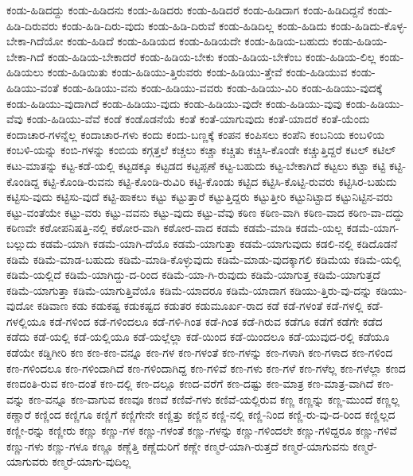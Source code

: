 {ಕಂಡು-ಹಿಡಿದದ್ದು
ಕಂಡು-ಹಿಡಿದನು
ಕಂಡು-ಹಿಡಿದರು
ಕಂಡು-ಹಿಡಿದರೆ
ಕಂಡು-ಹಿಡಿದಾಗ
ಕಂಡು-ಹಿಡಿದಿದ್ದನೆ
ಕಂಡು-ಹಿಡಿ-ದಿರುವರು
ಕಂಡು-ಹಿಡಿ-ದಿರು-ವುದು
ಕಂಡು-ಹಿಡಿ-ದಿರುವೆ
ಕಂಡು-ಹಿಡಿದಿಲ್ಲ
ಕಂಡು-ಹಿಡಿದು
ಕಂಡು-ಹಿಡಿದು-ಕೊಳ್ಳ-ಬೇಕಾ-ಗಿದೆಯೋ
ಕಂಡು-ಹಿಡಿದೆ
ಕಂಡು-ಹಿಡಿಯದ
ಕಂಡು-ಹಿಡಿಯದೇ
ಕಂಡು-ಹಿಡಿಯ-ಬಹುದು
ಕಂಡು-ಹಿಡಿಯ-ಬೇಕಾ-ಗಿದೆ
ಕಂಡು-ಹಿಡಿಯ-ಬೇಕಾದರೆ
ಕಂಡು-ಹಿಡಿಯ-ಬೇಕು
ಕಂಡು-ಹಿಡಿಯ-ಬೇಕೆಂಬ
ಕಂಡು-ಹಿಡಿಯ-ಲಿಲ್ಲ
ಕಂಡು-ಹಿಡಿಯಲು
ಕಂಡು-ಹಿಡಿಯಿತು
ಕಂಡು-ಹಿಡಿಯು-ತ್ತಿರುವರು
ಕಂಡು-ಹಿಡಿಯು-ತ್ತೇವೆ
ಕಂಡು-ಹಿಡಿಯುವ
ಕಂಡು-ಹಿಡಿಯು-ವಂತೆ
ಕಂಡು-ಹಿಡಿಯು-ವನು
ಕಂಡು-ಹಿಡಿಯು-ವವರು
ಕಂಡು-ಹಿಡಿಯು-ವಿರಿ
ಕಂಡು-ಹಿಡಿಯು-ವುದಕ್ಕೆ
ಕಂಡು-ಹಿಡಿಯು-ವುದಾಗಿದೆ
ಕಂಡು-ಹಿಡಿಯು-ವುದು
ಕಂಡು-ಹಿಡಿಯು-ವುದೇ
ಕಂಡು-ಹಿಡಿಯು-ವುವು
ಕಂಡು-ಹಿಡಿಯು-ವೆವು
ಕಂಡು-ಹಿಡಿಯು-ವೆವೆ
ಕಂಡೆ
ಕಂಡೊಡನೆಯೆ
ಕಂತೆ
ಕಂತೆ-ಯಾಗುವುದು
ಕಂತೆ-ಯಾದರೆ
ಕಂತೆ-ಯೆಂದು
ಕಂದಾಚಾರ-ಗಳನ್ನೆಲ್ಲ
ಕಂದಾಚಾರ-ಗಳು
ಕಂದು
ಕಂದು-ಬಣ್ಣಕ್ಕೆ
ಕಂಪನ
ಕಂಪಿಸಲು
ಕಂಪೆನಿ
ಕಂಬನಿಯ
ಕಂಬಳಿಯ
ಕಂಬಳಿ-ಯನ್ನು
ಕಂಬಿ-ಗಳನ್ನು
ಕಂಬಿಯ
ಕಗ್ಗತ್ತಲೆ
ಕಚ್ಚಲು
ಕಚ್ಚಾ
ಕಚ್ಚಿತು
ಕಚ್ಚಿಸಿ-ಕೊಂಡೇ
ಕಚ್ಚುತ್ತಿದ್ದರೆ
ಕಟಲ್
ಕಟಿಲ್
ಕಟು-ಮಾತನ್ನು
ಕಟ್ಟ-ಕಡೆ-ಯಲ್ಲಿ
ಕಟ್ಟಡಕ್ಕೂ
ಕಟ್ಟಡದ
ಕಟ್ಟಪ್ಪಣೆ
ಕಟ್ಟ-ಬಹುದು
ಕಟ್ಟ-ಬೇಕಾಗಿದೆ
ಕಟ್ಟಲು
ಕಟ್ಟಾ
ಕಟ್ಟಿ
ಕಟ್ಟಿ-ಕೊಂಡಿದ್ದ
ಕಟ್ಟಿ-ಕೊಂಡಿ-ರುವನು
ಕಟ್ಟಿ-ಕೊಂಡಿ-ರುವಿರಿ
ಕಟ್ಟಿ-ಕೊಂಡು
ಕಟ್ಟಿದ
ಕಟ್ಟಿಸಿ-ಕೊಟ್ಟಿ-ರುವರು
ಕಟ್ಟಿಸಿರ-ಬಹುದು
ಕಟ್ಟಿಸು-ವುದು
ಕಟ್ಟಿಸು-ವುದೆ
ಕಟ್ಟಿ-ಹಾಕಲು
ಕಟ್ಟು
ಕಟ್ಟುತ್ತಾರೆ
ಕಟ್ಟುತ್ತಿದ್ದರು
ಕಟ್ಟುತ್ತೀರಿ
ಕಟ್ಟುನಿಟ್ಟಾದ
ಕಟ್ಟುನಿಟ್ಟಿನ-ವರು
ಕಟ್ಟು-ವಂತೆಯೇ
ಕಟ್ಟು-ವರು
ಕಟ್ಟು-ವವನು
ಕಟ್ಟು-ವುದು
ಕಟ್ಟು-ವೆವು
ಕಠಿಣ
ಕಠಿಣ-ವಾಗಿ
ಕಠಿಣ-ವಾದ
ಕಠಿಣ-ವಾ-ದದ್ದು
ಕಠಿಣವೇ
ಕಠೋಪನಿಷತ್ತಿ-ನಲ್ಲಿ
ಕಠೋರ-ವಾಗಿ
ಕಠೋರ-ವಾದ
ಕಡಮೆ
ಕಡಮೆ-ಮಾಡಿ
ಕಡಮೆ-ಯಲ್ಲ
ಕಡಮೆ-ಯಾಗ-ಬಲ್ಲುದು
ಕಡಮೆ-ಯಾಗಿ
ಕಡಮೆ-ಯಾಗಿ-ದೆಯೊ
ಕಡಮೆ-ಯಾಗುತ್ತಾ
ಕಡಮೆ-ಯಾಗುವುದು
ಕಡಲಿ-ನಲ್ಲಿ
ಕಡಿದೊಡನೆ
ಕಡಿಮೆ
ಕಡಿಮೆ-ಮಾಡ-ಬಹುದು
ಕಡಿಮೆ-ಮಾಡಿ-ಕೊಳ್ಳುವುದು
ಕಡಿಮೆ-ಮಾಡು-ವುದಕ್ಕಾಗಲಿ
ಕಡಿಮೆಯ
ಕಡಿಮೆ-ಯಲ್ಲಿ
ಕಡಿಮೆ-ಯಲ್ಲಿದೆ
ಕಡಿಮೆ-ಯಾಗಿದ್ದು-ದ-ರಿಂದ
ಕಡಿಮೆ-ಯಾ-ಗಿ-ರುವುದು
ಕಡಿಮೆ-ಯಾಗುತ್ತ
ಕಡಿಮೆ-ಯಾಗುತ್ತದೆ
ಕಡಿಮೆ-ಯಾಗುತ್ತಾ
ಕಡಿಮೆ-ಯಾಗುತ್ತಿವೆಯೊ
ಕಡಿಮೆ-ಯಾದರೂ
ಕಡಿಮೆ-ಯಾದಾಗ
ಕಡಿಯು-ತ್ತಿರು-ವು-ದನ್ನು
ಕಡಿಯು-ವುದೋ
ಕಡಿವಾಣ
ಕಡು
ಕಡುಕಷ್ಟ
ಕಡುಕಷ್ಟದ
ಕಡುತರ
ಕಡುಮೂರ್ಖ-ರಾದ
ಕಡೆ
ಕಡೆ-ಗಳಂತೆ
ಕಡೆ-ಗಳಲ್ಲಿ
ಕಡೆ-ಗಳಲ್ಲಿಯೂ
ಕಡೆ-ಗಳಿಂದ
ಕಡೆ-ಗಳಿಂದಲೂ
ಕಡೆ-ಗಳಿ-ಗಿಂತ
ಕಡೆ-ಗಿಂತ
ಕಡೆ-ಗಿರುವ
ಕಡೆಗೂ
ಕಡೆಗೆ
ಕಡೆಗೇ
ಕಡೆದ
ಕಡೆದು
ಕಡೆ-ಯಲ್ಲಿ
ಕಡೆ-ಯಲ್ಲಿಯೂ
ಕಡೆ-ಯಲ್ಲೆಲ್ಲಾ
ಕಡೆ-ಯಿಂದ
ಕಡೆ-ಯಿಂದಲೂ
ಕಡೆ-ಯುವುದ-ರಲ್ಲಿ
ಕಡೆಯೂ
ಕಡೆಯೇ
ಕಡ್ಡಿಗೀರಿ
ಕಣ
ಕಣ-ಕಣ-ವನ್ನೂ
ಕಣ-ಗಳ
ಕಣ-ಗಳಂತೆ
ಕಣ-ಗಳನ್ನು
ಕಣ-ಗಳಾಗಿ
ಕಣ-ಗಳಾದ
ಕಣ-ಗಳಿಂದ
ಕಣ-ಗಳಿಂದಲೂ
ಕಣ-ಗಳಿಂದಾಗಿದೆ
ಕಣ-ಗಳಿಂದಾಗಿದ್ದ
ಕಣ-ಗಳಿವೆ
ಕಣ-ಗಳು
ಕಣ-ಗಳೆ
ಕಣ-ಗಳೆಲ್ಲ
ಕಣ-ಗಳೆಲ್ಲಾ
ಕಣದ
ಕಣದಂತಿ-ರುವ
ಕಣ-ದಂತೆ
ಕಣ-ದಲ್ಲಿ
ಕಣ-ದಲ್ಲೂ
ಕಣದ-ವರೆಗೆ
ಕಣ-ದಷ್ಟು
ಕಣ-ಮಾತ್ರ
ಕಣ-ಮಾತ್ರ-ವಾಗಿದೆ
ಕಣ-ವನ್ನು
ಕಣ-ವನ್ನೂ
ಕಣ-ವಾಗುವ
ಕಣವೂ
ಕಣವೆ
ಕಣಿವೆ-ಗಳು
ಕಣಿವೆ-ಯಲ್ಲಿರುವ
ಕಣ್ಣ
ಕಣ್ಣನ್ನು
ಕಣ್ಣ-ಮುಂದೆ
ಕಣ್ಣಲ್ಲ
ಕಣ್ಣಾರೆ
ಕಣ್ಣಿಂದ
ಕಣ್ಣಿಗೂ
ಕಣ್ಣಿಗೆ
ಕಣ್ಣಿಗೇನೇ
ಕಣ್ಣಿತ್ತು
ಕಣ್ಣಿನ
ಕಣ್ಣಿ-ನಲ್ಲಿ
ಕಣ್ಣಿ-ನಿಂದ
ಕಣ್ಣಿ-ರು-ವು-ದ-ರಿಂದ
ಕಣ್ಣಿಲ್ಲದ
ಕಣ್ಣೀ-ರನ್ನು
ಕಣ್ಣೀರು
ಕಣ್ಣು
ಕಣ್ಣು-ಗಳ
ಕಣ್ಣು-ಗಳಂತೆ
ಕಣ್ಣು-ಗಳನ್ನು
ಕಣ್ಣು-ಗಳಿಂದಲೇ
ಕಣ್ಣು-ಗಳಿದ್ದರೂ
ಕಣ್ಣು-ಗಳಿವೆ
ಕಣ್ಣು-ಗಳು
ಕಣ್ಣು-ಗಳೂ
ಕಣ್ಣೂ
ಕಣ್ಣೆತ್ತಿ
ಕಣ್ಣೆದುರಿಗೆ
ಕಣ್ಣೇ
ಕಣ್ಮರೆ-ಯಾಗಿ-ರುತ್ತದೆ
ಕಣ್ಮರೆ-ಯಾಗುವನು
ಕಣ್ಮರೆ-ಯಾಗುವರು
ಕಣ್ಮರೆ-ಯಾಗು-ವುದಿಲ್ಲ
}
